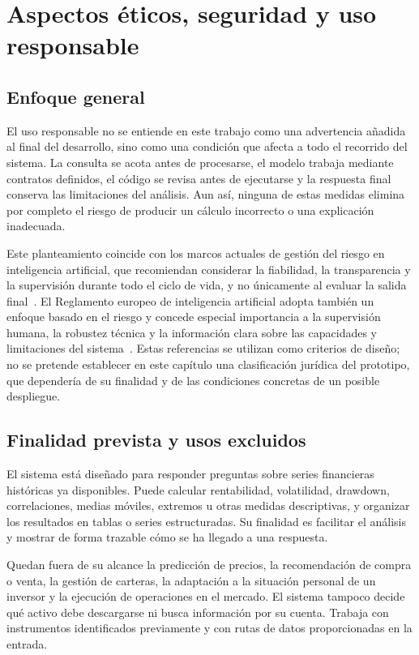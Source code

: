 \chapter{Aspectos éticos, seguridad y uso responsable}

\section{Enfoque general}

El uso responsable no se entiende en este trabajo como una advertencia añadida al final del desarrollo, sino como una condición que afecta a todo el recorrido del sistema. La consulta se acota antes de procesarse, el modelo trabaja mediante contratos definidos, el código se revisa antes de ejecutarse y la respuesta final conserva las limitaciones del análisis. Aun así, ninguna de estas medidas elimina por completo el riesgo de producir un cálculo incorrecto o una explicación inadecuada.

Este planteamiento coincide con los marcos actuales de gestión del riesgo en inteligencia artificial, que recomiendan considerar la fiabilidad, la transparencia y la supervisión durante todo el ciclo de vida, y no únicamente al evaluar la salida final~\cite{nist2024genai}. El Reglamento europeo de inteligencia artificial adopta también un enfoque basado en el riesgo y concede especial importancia a la supervisión humana, la robustez técnica y la información clara sobre las capacidades y limitaciones del sistema~\cite{euai2024regulation}. Estas referencias se utilizan como criterios de diseño; no se pretende establecer en este capítulo una clasificación jurídica del prototipo, que dependería de su finalidad y de las condiciones concretas de un posible despliegue.

\section{Finalidad prevista y usos excluidos}

El sistema está diseñado para responder preguntas sobre series financieras históricas ya disponibles. Puede calcular rentabilidad, volatilidad, drawdown, correlaciones, medias móviles, extremos u otras medidas descriptivas, y organizar los resultados en tablas o series estructuradas. Su finalidad es facilitar el análisis y mostrar de forma trazable cómo se ha llegado a una respuesta.

Quedan fuera de su alcance la predicción de precios, la recomendación de compra o venta, la gestión de carteras, la adaptación a la situación personal de un inversor y la ejecución de operaciones en el mercado. El sistema tampoco decide qué activo debe descargarse ni busca información por su cuenta. Trabaja con instrumentos identificados previamente y con rutas de datos proporcionadas en la entrada.

